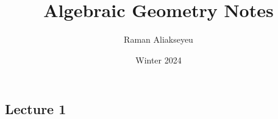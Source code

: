 \documentclass[12pt]{article}
\title{Algebraic Geometry Notes}
\author{Raman Aliakseyeu}
\date{Winter 2024}
\begin{document}
    \maketitle
    \section{} %
    \subsection{Lecture 1} %
\end{document}
